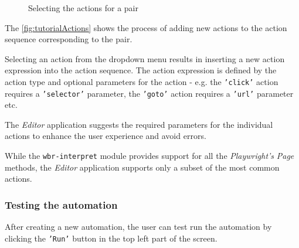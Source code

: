 \begin{figure}[!h]
    \begin{center}
    \end{center}
    \caption{Selecting the actions for a pair}\label{fig:tutorialActions}
\end{figure}

The \autoref{fig:tutorialActions} shows the process of adding new actions to the action sequence corresponding to the pair.

Selecting an action from the dropdown menu results in inserting a new action expression into the action sequence.
The action expression is defined by the action type and optional parameters for the action - e.g. the \texttt{'click'} action requires a \texttt{'selector'} parameter,
the \texttt{'goto'} action requires a \texttt{'url'} parameter etc.

The \textit{Editor} application suggests the required parameters for the individual actions to enhance the user experience and avoid errors.

While the \texttt{wbr-interpret} module provides support for all the \textit{Playwright's} \textit{Page} methods, the \textit{Editor} application supports only a subset of the most common actions.

\subsubsection{Testing the automation}

After creating a new automation, the user can test run the automation by clicking the \texttt{'Run'} button in the top left part of the screen.

